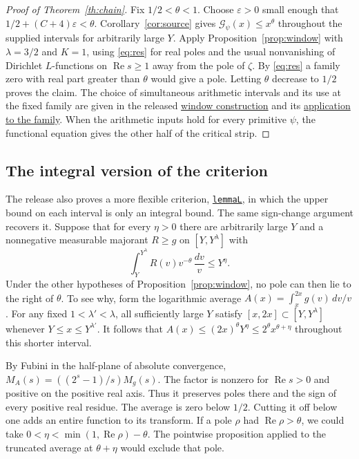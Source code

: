 \documentclass[11pt,letterpaper]{article}
\newcommand{\eps}{\varepsilon}
\newcommand{\Rea}{\operatorname{Re}}
\newcommand{\src}[2]{\href{https://github.com/leanprover-community/riemann-hypothesis/blob/main/src/#1.lean}{#2}}
\numberwithin{equation}{section}
\begin{document}
\begin{proof}[Proof of Theorem~\ref{th:chain}]
Fix \(1/2<\theta<1\). Choose \(\eps>0\) small enough that \(1/2+(C+4)\eps<\theta\). Corollary~\ref{cor:source} gives \(\mathcal G_\psi(x)\le x^\theta\) throughout the supplied intervals for arbitrarily large \(Y\). Apply Proposition~\ref{prop:window} with \(\lambda=3/2\) and \(K=1\), using \eqref{eq:res} for real poles and the usual nonvanishing of Dirichlet \(L\)-functions on \(\Rea s\ge1\) away from the pole of \(\zeta\). By \eqref{eq:res} a family zero with real part greater than \(\theta\) would give a pole. Letting \(\theta\) decrease to \(1/2\) proves the claim. The choice of simultaneous arithmetic intervals and its use at the fixed family are given in the released
\src{Development/AutomorphicArithmetic/CharacterBoxes/EveryCharacter}{window construction}
and its \src{Development/AutomorphicArithmetic/PrimitiveCosets/Imports}{application to the family}. When the arithmetic inputs hold for every primitive \(\psi\), the functional equation gives the other half of the critical strip.
\end{proof}

\subsection*{The integral version of the criterion}

The release also proves a more flexible criterion, \src{Development/AutomorphicArithmetic/DedekindLFunctions/LandauTheorems/lemmaL}{\texttt{lemmaL}}, in which the upper bound on each interval is only an integral bound. The same sign-change argument recovers it. Suppose that for every \(\eta>0\) there are arbitrarily large \(Y\) and a nonnegative measurable majorant \(R\ge g\) on \([Y,Y^\lambda]\) with
\[
                      \int_Y^{Y^\lambda}R(v)v^{-\theta}\,\frac{dv}{v}
                           \le Y^\eta .
\]
Under the other hypotheses of Proposition~\ref{prop:window}, no pole can then lie to the right of \(\theta\). To see why, form the logarithmic average \(A(x)=\int_x^{2x}g(v)\,dv/v\). For any fixed \(1<\lambda'<\lambda\), all sufficiently large \(Y\) satisfy \([x,2x]\subset[Y,Y^\lambda]\) whenever \(Y\le x\le Y^{\lambda'}\). It follows that \(A(x)\le(2x)^\theta Y^\eta\le 2^\theta x^{\theta+\eta}\) throughout this shorter interval.

By Fubini in the half-plane of absolute convergence, \(M_A(s)=((2^s-1)/s)M_g(s)\). The factor is nonzero for \(\Rea s>0\) and positive on the positive real axis. Thus it preserves poles there and the sign of every positive real residue. The average is zero below \(1/2\). Cutting it off below one adds an entire function to its transform. If a pole \(\rho\) had \(\Rea\rho>\theta\), we could take \(0<\eta<\min(1,\Rea\rho)-\theta\). The pointwise proposition applied to the truncated average at \(\theta+\eta\) would exclude that pole.
\end{document}
